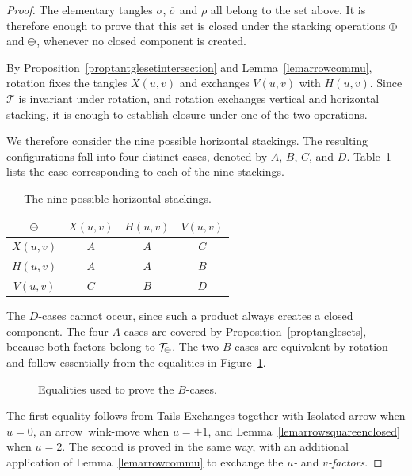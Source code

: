 \documentclass[10pt,a4paper]{amsart}
\newcommand{\hstack}{
  \mathbin{
    \tikz[baseline=-0.582ex]
      \draw[line width=.1ex, line cap=round]
        (0,0) circle (.75ex)
        (-.5ex,0) -- (.5ex,0);
  }
}
\newcommand{\subhstack}{
  \mathbin{
    \tikz[baseline=-0.449ex]
      \draw[line width=.075ex,line cap=round]
        (0,0) circle (.5625ex)
        (-.375ex,0)--(.375ex,0);
  }
}
\newcommand{\vstack}{
  \mathbin{
    \tikz[baseline=-0.582ex]
      \draw[line width=.1ex, line cap=round]
        (0,0) circle (.75ex)
        (0,-.5ex) -- (0,.5ex);
  }
}
\begin{document}
\begin{proof}
The elementary tangles $\sigma$, $\overline{\sigma}$ and $\rho$ all belong to the set above. It is therefore enough to prove that this set is closed under the stacking operations $\vstack$ and $\hstack$, whenever no closed component is created.

By Proposition~\ref{proptantglesetintersection} and Lemma~\ref{lemarrowcommu}, rotation fixes the tangles $X(u,v)$ and exchanges $V(u,v)$ with $H(u,v)$. Since $\mathcal T$ is invariant under rotation, and rotation exchanges vertical and horizontal stacking, it is enough to establish closure under one of the two operations.

We therefore consider the nine possible horizontal stackings. The resulting configurations fall into four distinct cases, denoted by $A$, $B$, $C$, and $D$. Table~\ref{tablestack} lists the case corresponding to each of the nine stackings.

\begin{table}[!htbp]
\centering
\begin{tabular}{|c|c|c|c|}
\hline
$\hstack$ & $X(u,v)$ & $H(u,v)$ & $V(u,v)$\\
\hline
$X(u,v)$ & $A$ & $A$ & $C$\\
\hline
$H(u,v)$ & $A$ & $A$ & $B$\\
\hline
$V(u,v)$ & $C$ & $B$ & $D$\\
\hline
\end{tabular}
\vspace{0.3cm}
\caption{The nine possible horizontal stackings.}
\label{tablestack}
\end{table}
\vspace{-0.4cm}
The $D$-cases cannot occur, since such a product always creates a closed component. The four $A$-cases are covered by Proposition~\ref{proptanglesets}, because both factors belong to $\mathcal T_{\subhstack}$. The two $B$-cases are equivalent by rotation and follow essentially from the equalities in Figure~\ref{figthmproofBcases}.

\begin{figure}[!htbp]
\centering

\caption{Equalities used to prove the $B$-cases.}
\label{figthmproofBcases}
\end{figure}

The first equality follows from Tails Exchanges together with Isolated arrow when $u=0$, an arrow~wink-move when $u=\pm1$, and Lemma~\ref{lemarrowsquareenclosed} when $u=2$. The second is proved in the same way, with an additional application of Lemma~\ref{lemarrowcommu} to exchange the \emph{$u$-} and \emph{$v$-factors}.


\end{proof}
\end{document}
